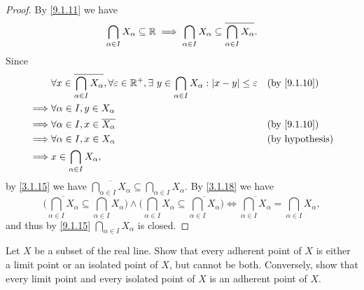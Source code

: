 \begin{proof}
  By \cref{9.1.11} we have
  \[
    \bigcap_{\alpha \in I} X_{\alpha} \subseteq \mathbb{R} \implies \bigcap_{\alpha \in I} X_{\alpha} \subseteq \overline{\bigcap_{\alpha \in I} X_{\alpha}}.
  \]
  Since
  \begin{align*}
             & \forall x \in \overline{\bigcap_{\alpha \in I} X_{\alpha}}, \forall \varepsilon \in \R^+, \exists\ y \in \bigcap_{\alpha \in I} X_{\alpha} : \abs{x - y} \leq \varepsilon &  & \text{(by \cref{9.1.10})} \\
    \implies & \forall \alpha \in I, y \in X_{\alpha}                                                                                                                                                                   \\
    \implies & \forall \alpha \in I, x \in \overline{X_{\alpha}}                                                                                                                         &  & \text{(by \cref{9.1.10})} \\
    \implies & \forall \alpha \in I, x \in X_{\alpha}                                                                                                                                    &  & \text{(by hypothesis)}    \\
    \implies & x \in \bigcap_{\alpha \in I} X_{\alpha},
  \end{align*}
  by \cref{3.1.15} we have \(\overline{\bigcap_{\alpha \in I} X_{\alpha}} \subseteq \bigcap_{\alpha \in I} X_{\alpha}\).
  By \cref{3.1.18} we have
  \[
    \bigg(\overline{\bigcap_{\alpha \in I} X_{\alpha}} \subseteq \bigcap_{\alpha \in I} X_{\alpha}\bigg) \land \bigg(\bigcap_{\alpha \in I} X_{\alpha} \subseteq \overline{\bigcap_{\alpha \in I} X_{\alpha}}\bigg) \iff \overline{\bigcap_{\alpha \in I} X_{\alpha}} = \bigcap_{\alpha \in I} X_{\alpha},
  \]
  and thus by \cref{9.1.15} \(\bigcap_{\alpha \in I} X_{\alpha}\) is closed.
\end{proof}

\begin{ex}\label{ex:9.1.9}
  Let \(X\) be a subset of the real line.
  Show that every adherent point of \(X\) is either a limit point or an isolated point of \(X\), but cannot be both.
  Conversely, show that every limit point and every isolated point of \(X\) is an adherent point of \(X\).
\end{ex}

